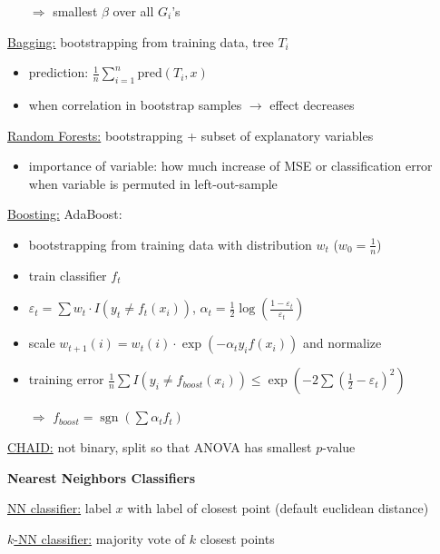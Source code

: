 \documentclass[10pt,landscape,a4paper]{article}
\DeclareMathOperator{\sgn}{sgn}
\begin{document}
\begin{multicols*}{4}
\begin{itemize}
	\item[$\Rightarrow$] smallest $\beta$ over all $G_i$'s
\end{itemize}
\underline{Bagging:} bootstrapping from training data, tree $T_i$
\begin{itemize}
	\item prediction: $\frac{1}{n}\sum_{i=1}^n \text{pred}(T_i,x)$
	\item when correlation in bootstrap samples $\to$ effect decreases
\end{itemize}
\underline{Random Forests:} bootstrapping + subset of explanatory variables
\begin{itemize}
	\item importance of variable: how much increase of MSE or classification error when variable is permuted in left-out-sample
\end{itemize}
\underline{Boosting:} AdaBoost: 
\begin{itemize}
	\item bootstrapping from training data with distribution $w_t$ ($w_0 = \frac{1}{n}$)
	\item train classifier $f_t$
	\item $\varepsilon_t = \sum w_t\cdot I(y_t\neq f_t(x_i))$, $\alpha_t = \frac{1}{2}\log\left(\frac{1-\varepsilon_t}{\varepsilon_t}\right)$
	\item scale $w_{t+1}(i) = w_t(i)\cdot\exp(-\alpha_ty_if(x_i))$ and normalize
	\item training error $\frac{1}{n}\sum I(y_i\neq f_{boost}(x_i)) \le \exp\left(-2\sum \left(\frac{1}{2}-\varepsilon_t\right)^2\right)$
	\item[$\Rightarrow$] $f_{boost} = \sgn\left(\sum \alpha_tf_t\right)$
\end{itemize}
\underline{CHAID:} not binary, split so that ANOVA has smallest $p$-value

\begin{center}
	\normalsize{\textbf{Nearest Neighbors Classifiers}} \\
\end{center}
\underline{NN classifier:} label $x$ with label of closest point (default euclidean distance)

\underline{$k$-NN classifier:} majority vote of $k$ closest points


\end{multicols*}
\end{document}
